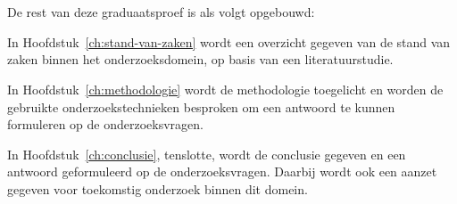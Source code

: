 \section{}%
\label{sec:opzet-graduaatsproef}


De rest van deze graduaatsproef is als volgt opgebouwd:

In Hoofdstuk~\ref{ch:stand-van-zaken} wordt een overzicht gegeven van de stand van zaken binnen het onderzoeksdomein, op basis van een literatuurstudie.

In Hoofdstuk~\ref{ch:methodologie} wordt de methodologie toegelicht en worden de gebruikte onderzoekstechnieken besproken om een antwoord te kunnen formuleren op de onderzoeksvragen.


In Hoofdstuk~\ref{ch:conclusie}, tenslotte, wordt de conclusie gegeven en een antwoord geformuleerd op de onderzoeksvragen. Daarbij wordt ook een aanzet gegeven voor toekomstig onderzoek binnen dit domein.